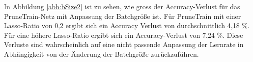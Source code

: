 In Abbildung \ref{abb:bSize2} ist zu sehen, wie gross der Accuracy-Verlust für das PruneTrain-Netz mit Anpassung der Batchgröße ist. Für PruneTrain mit einer Lasso-Ratio von 0,2 ergibt sich ein Accuracy Verlust von durchschnittlich 4,18 \%. Für eine höhere Lasso-Ratio ergibt sich ein Accuracy-Verlust von 7,24 \%. Diese Verluste sind wahrscheinlich auf eine nicht passende Anpassung der Lernrate in Abhängigkeit von der Änderung der Batchgröße zurückzuführen.











